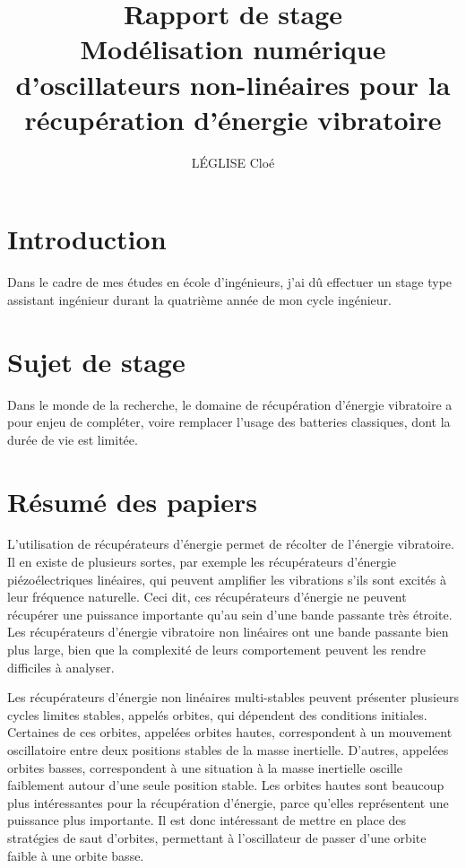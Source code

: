 \documentclass[a4paper, french, 12pt, titlepage]{report}
\title{Rapport de stage \\ Modélisation numérique d’oscillateurs non-linéaires pour
la récupération d’énergie vibratoire}
\author{LÉGLISE Cloé}
\begin{document}
\maketitle

\section{Introduction}

Dans le cadre de mes études en école d'ingénieurs, j'ai dû effectuer un stage type assistant ingénieur durant la quatrième année de mon cycle ingénieur. 

\section{Sujet de stage}

Dans le monde de la recherche, le domaine de récupération d'énergie vibratoire a pour enjeu de compléter, voire remplacer l'usage des batteries classiques, dont la durée de vie est limitée.  

\section{Résumé des papiers}

L'utilisation de récupérateurs d'énergie permet de récolter de l'énergie vibratoire. Il en existe de plusieurs sortes, par exemple les récupérateurs d'énergie piézoélectriques linéaires, qui peuvent amplifier les vibrations s'ils sont excités à leur fréquence naturelle. Ceci dit, ces récupérateurs d'énergie ne peuvent récupérer une puissance importante qu'au sein d'une bande passante très étroite. Les récupérateurs d'énergie vibratoire non linéaires ont une bande passante bien plus large, bien que la complexité de leurs comportement peuvent les rendre difficiles à analyser. 

Les récupérateurs d'énergie non linéaires multi-stables peuvent présenter plusieurs cycles limites stables, appelés orbites, qui dépendent des conditions initiales. Certaines de ces orbites, appelées orbites hautes, correspondent à un mouvement oscillatoire entre deux positions stables de la masse inertielle. D'autres, appelées orbites basses, correspondent à une situation à la masse inertielle oscille faiblement autour d'une seule position stable. Les orbites hautes sont beaucoup plus intéressantes pour la récupération d'énergie, parce qu'elles représentent une puissance plus importante. Il est donc intéressant de mettre en place des stratégies de saut d'orbites, permettant à l'oscillateur de passer d'une orbite faible à une orbite basse. 
\end{document}
